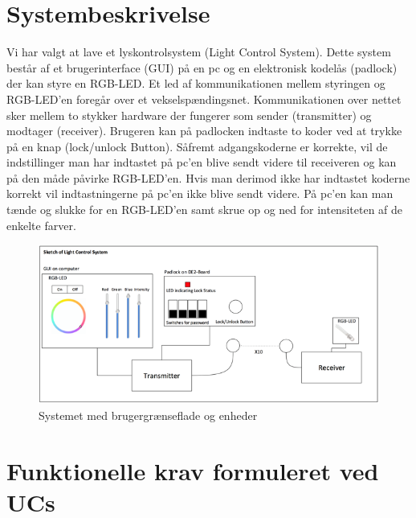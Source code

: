 \documentclass[oneside]{memoir}
\begin{document}
		\section{Systembeskrivelse}	
Vi har valgt at lave et lyskontrolsystem (Light Control System). Dette system består af et brugerinterface (GUI) på en pc og en elektronisk kodelås (padlock) der kan styre en RGB-LED. Et led af kommunikationen mellem styringen og RGB-LED’en foregår over et vekselspændingsnet. 
Kommunikationen over nettet sker mellem to stykker hardware der fungerer som sender (transmitter) og modtager (receiver). 
Brugeren kan på padlocken indtaste to koder ved at trykke på en knap (lock/unlock Button). Såfremt adgangskoderne er korrekte, vil de indstillinger man har indtastet på pc’en blive sendt videre til receiveren og kan på den måde påvirke RGB-LED’en. Hvis man derimod ikke har indtastet koderne korrekt vil indtastningerne på pc’en ikke blive sendt videre. På pc’en kan man tænde og slukke for en RGB-LED’en samt skrue op og ned for intensiteten af de enkelte farver.


\begin{figure}[H]
\centering
\includegraphics[width=0.9\linewidth]{"Kravspecifikation/Systembeskrivelse"}
\caption{Systemet med brugergrænseflade og enheder}
\label{fig:Systembeskrivelse}
\end{figure}

        \section{Funktionelle krav formuleret ved UCs}
\end{document}
